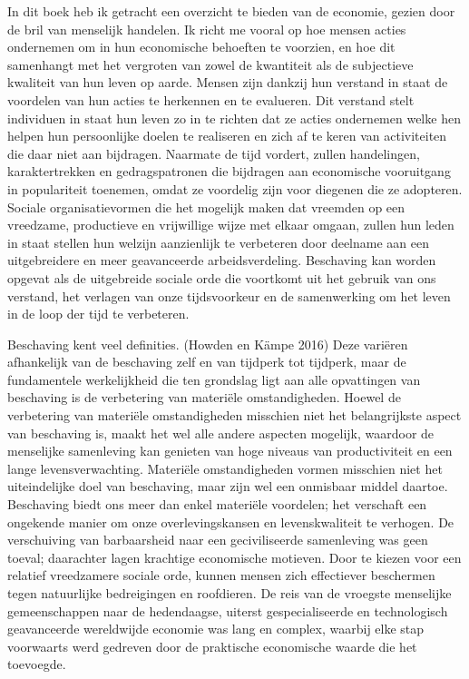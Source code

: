 \documentclass[
  a5paper,
  smalldemyvopaper,11pt,twoside,onecolumn,openright,extrafontsizes,
hidelinks]{memoir}
\begin{document}
In dit boek heb ik getracht een overzicht te bieden van de economie,
gezien door de bril van menselijk handelen. Ik richt me vooral op hoe
mensen acties ondernemen om in hun economische behoeften te voorzien, en
hoe dit samenhangt met het vergroten van zowel de kwantiteit als de
subjectieve kwaliteit van hun leven op aarde. Mensen zijn dankzij hun
verstand in staat de voordelen van hun acties te herkennen en te
evalueren. Dit verstand stelt individuen in staat hun leven zo in te
richten dat ze acties ondernemen welke hen helpen hun persoonlijke
doelen te realiseren en zich af te keren van activiteiten die daar niet
aan bijdragen. Naarmate de tijd vordert, zullen handelingen,
karaktertrekken en gedragspatronen die bijdragen aan economische
vooruitgang in populariteit toenemen, omdat ze voordelig zijn voor
diegenen die ze adopteren. Sociale organisatievormen die het mogelijk
maken dat vreemden op een vreedzame, productieve en vrijwillige wijze
met elkaar omgaan, zullen hun leden in staat stellen hun welzijn
aanzienlijk te verbeteren door deelname aan een uitgebreidere en meer
geavanceerde arbeidsverdeling. Beschaving kan worden opgevat als de
uitgebreide sociale orde die voortkomt uit het gebruik van ons verstand,
het verlagen van onze tijdsvoorkeur en de samenwerking om het leven in
de loop der tijd te verbeteren.

Beschaving kent veel definities. (Howden en Kämpe 2016) Deze variëren
afhankelijk van de beschaving zelf en van tijdperk tot tijdperk, maar de
fundamentele werkelijkheid die ten grondslag ligt aan alle opvattingen
van beschaving is de verbetering van materiële omstandigheden. Hoewel de
verbetering van materiële omstandigheden misschien niet het
belangrijkste aspect van beschaving is, maakt het wel alle andere
aspecten mogelijk, waardoor de menselijke samenleving kan genieten van
hoge niveaus van productiviteit en een lange levensverwachting.
Materiële omstandigheden vormen misschien niet het uiteindelijke doel
van beschaving, maar zijn wel een onmisbaar middel daartoe. Beschaving
biedt ons meer dan enkel materiële voordelen; het verschaft een
ongekende manier om onze overlevingskansen en levenskwaliteit te
verhogen. De verschuiving van barbaarsheid naar een geciviliseerde
samenleving was geen toeval; daarachter lagen krachtige economische
motieven. Door te kiezen voor een relatief vreedzamere sociale orde,
kunnen mensen zich effectiever beschermen tegen natuurlijke bedreigingen
en roofdieren. De reis van de vroegste menselijke gemeenschappen naar de
hedendaagse, uiterst gespecialiseerde en technologisch geavanceerde
wereldwijde economie was lang en complex, waarbij elke stap voorwaarts
werd gedreven door de praktische economische waarde die het toevoegde.
\end{document}
